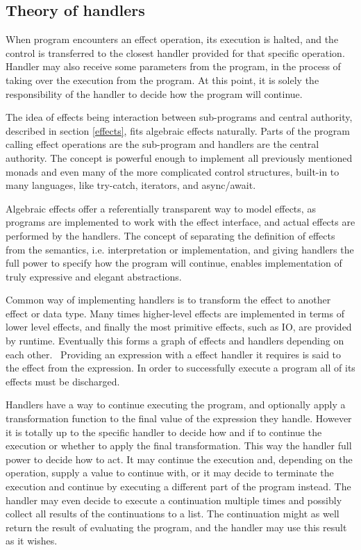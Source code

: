 \subsection{Theory of handlers}
When program encounters an effect operation, its execution is halted, and the control is transferred to the closest handler provided for that specific operation. Handler may also receive some parameters from the program, in the process of taking over the execution from the program. At this point, it is solely the responsibility of the handler to decide how the program will continue.

The idea of effects being interaction between sub-programs and central authority, described in section \ref{effects}, fits algebraic effects naturally. Parts of the program calling effect operations are the sub-program and handlers are the central authority. The concept is powerful enough to implement all previously mentioned monads and even many of the more complicated control structures, built-in to many languages, like try-catch, iterators, and async/await.~\cite{alg-effs-for-fp}

Algebraic effects offer a referentially transparent way to model effects, as programs are implemented to work with the effect interface, and actual effects are performed by the handlers. The concept of separating the definition of effects from the semantics, i.e. interpretation or implementation, and giving handlers the full power to specify how the program will continue, enables implementation of truly expressive and elegant abstractions.

Common way of implementing handlers is to transform the effect to another effect or data type. Many times higher-level effects are implemented in terms of lower level effects, and finally the most primitive effects, such as IO, are provided by runtime. Eventually this forms a graph of effects and handlers depending on each other.~\cite{intro-to-alg-eff} Providing an expression with a effect handler it requires is said to  the effect from the expression. In order to successfully execute a program all of its effects must be discharged.

Handlers have a way to continue executing the program, and optionally apply a transformation function to the final value of the expression they handle. However it is totally up to the specific handler to decide how and if to continue the execution or whether to apply the final transformation. This way the handler full power to decide how to act. It may continue the execution and, depending on the operation, supply a value to continue with, or it may decide to terminate the execution and continue by executing a different part of the program instead. The handler may even decide to execute a continuation multiple times and possibly collect all results of the continuations to a list. The continuation might as well return the result of evaluating the program, and the handler may use this result as it wishes.

